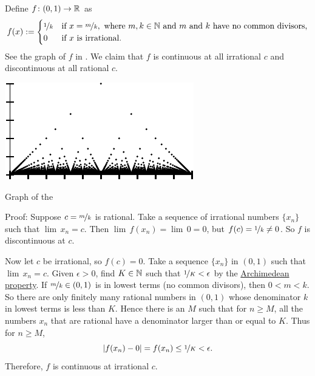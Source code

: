\begin{example} \label{popcornfunction:example}
Define $f \colon (0,1) \to {\mathbb{R}}$ as
\begin{equation*}
f(x) := 
\begin{cases}
\nicefrac{1}{k} & \text{if } x=\nicefrac{m}{k}, \text{ where } m,k \in {\mathbb{N}}
\text{ and } m \text{ and } k \text{ have no common divisors,} \\
0 & \text{if } x \text{ is irrational.}
\end{cases}
\end{equation*}
See the graph of $f$
in .
We claim that
$f$ is continuous at all irrational $c$ and 
discontinuous at all rational $c$.
\begin{myfigureht}
\includegraphics{figures/popcornfig}
\caption{Graph of the \label{popcornfig}}
\end{myfigureht}

Proof:
Suppose $c = \nicefrac{m}{k}$ is rational.  Take a sequence of
irrational numbers $\{ x_n \}$ such that $\lim\, x_n = c$.  Then
$\lim\, f(x_n) = \lim \, 0 = 0$, but $f(c) = \nicefrac{1}{k} \not= 0$.  So $f$
is discontinuous at $c$.

Now let $c$ be irrational, so $f(c) = 0$.  Take a sequence 
$\{ x_n \}$ in $(0,1)$ such that $\lim\, x_n = c$.
Given $\epsilon > 0$, find $K \in {\mathbb{N}}$ such
that $\nicefrac{1}{K} < \epsilon$
by the \hyperref[thm:arch:i]{Archimedean property}.
If $\nicefrac{m}{k} \in (0,1)$ is in lowest terms
(no common divisors), then $0 < m < k$.
So there are only finitely many rational numbers in $(0,1)$
whose denominator $k$ in lowest terms is less than $K$.  Hence
there is an $M$ such that for $n \geq M$, all the numbers $x_n$
that are rational
have a denominator larger than or equal to $K$.  Thus for $n \geq M$,
\begin{equation*}
\left\lvert {f(x_n) - 0} \right\rvert = f(x_n) \leq \nicefrac{1}{K} < \epsilon .
\end{equation*}
Therefore, $f$ is continuous at irrational $c$.
\end{example}

